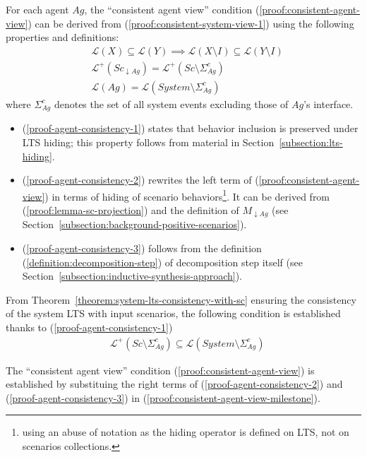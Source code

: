 For each agent $Ag$, the ``consistent agent view'' condition (\ref{proof:consistent-agent-view}) can be derived from (\ref{proof:consistent-system-view-1}) using the following properties and definitions:
\begin{align}
&\mathcal{L}(X) \subseteq \mathcal{L}(Y) \implies \mathcal{L}(X \setminus I) \subseteq \mathcal{L}(Y \setminus I) \label{proof-agent-consistency-1}\\
&\mathcal{L}^+(Sc_{\downarrow Ag}) = \mathcal{L}^+(Sc \setminus \Sigma_{Ag}^c)\label{proof-agent-consistency-2}\\
&\mathcal{L}(Ag) = \mathcal{L}(System \setminus \Sigma_{Ag}^c)\label{proof-agent-consistency-3}
\end{align}
where $\Sigma_{Ag}^c$ denotes the set of all system events excluding those of $Ag$'s interface.
\begin{itemize}
\item (\ref{proof-agent-consistency-1}) states that behavior inclusion is preserved under LTS hiding; this property follows from material in Section~\ref{subsection:lts-hiding}. 
\item (\ref{proof-agent-consistency-2}) rewrites the left term of (\ref{proof:consistent-agent-view}) in terms of hiding of scenario behaviors\footnote{using an abuse of notation as the hiding operator is defined on LTS, not on scenarios collections.}. It can be derived from (\ref{proof:lemma-sc-projection}) and the definition of $M_{\downarrow Ag}$ (see Section~\ref{subsection:background-positive-scenarios}). 
\item (\ref{proof-agent-consistency-3}) follows from the definition (\ref{definition:decomposition-step}) of decomposition step itself (see Section~\ref{subsection:inductive-synthesis-approach}). 
\end{itemize}

From Theorem~\ref{theorem:system-lts-consistency-with-sc} ensuring the consistency of the system LTS with input scenarios, the following condition is established thanks to (\ref{proof-agent-consistency-1})
\begin{align}
&\mathcal{L}^+(Sc \setminus \Sigma_{Ag}^c) \subseteq \mathcal{L}(System \setminus \Sigma_{Ag}^c)\label{proof:consistent-agent-view-milestone}
\end{align}

The ``consistent agent view'' condition (\ref{proof:consistent-agent-view}) is established by substituing the right terms of (\ref{proof-agent-consistency-2}) and (\ref{proof-agent-consistency-3}) in (\ref{proof:consistent-agent-view-milestone}).

